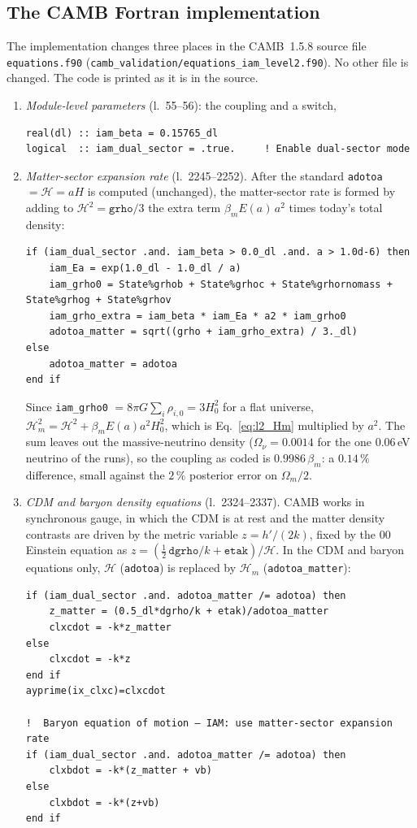 \subsection{The CAMB Fortran implementation}\label{sec:l2_code}
The implementation changes three places in the CAMB~1.5.8 source file \texttt{equations.f90} (\texttt{camb\_validation/equations\_iam\_level2.f90}).
No other file is changed. The code is printed as it is in the source.
\begin{enumerate}
\item \emph{Module-level parameters} (l.~55--56): the coupling and a switch,
\begin{Verbatim}[breaklines,breakanywhere,fontsize=\footnotesize]
real(dl) :: iam_beta = 0.15765_dl
logical  :: iam_dual_sector = .true.     ! Enable dual-sector mode
\end{Verbatim}
\item \emph{Matter-sector expansion rate} (l.~2245--2252). After the standard \texttt{adotoa} $=\mathcal H=aH$ is computed (unchanged), the
matter-sector rate is formed by adding to $\mathcal H^2=\texttt{grho}/3$ the extra term $\beta_mE(a)\,a^2$ times today's total density:
\begin{Verbatim}[breaklines,breakanywhere,fontsize=\footnotesize]
if (iam_dual_sector .and. iam_beta > 0.0_dl .and. a > 1.0d-6) then
    iam_Ea = exp(1.0_dl - 1.0_dl / a)
    iam_grho0 = State%grhob + State%grhoc + State%grhornomass + State%grhog + State%grhov
    iam_grho_extra = iam_beta * iam_Ea * a2 * iam_grho0
    adotoa_matter = sqrt((grho + iam_grho_extra) / 3._dl)
else
    adotoa_matter = adotoa
end if
\end{Verbatim}
Since \texttt{iam\_grho0} $=8\pi G\sum_i\rho_{i,0}=3H_0^2$ for a flat universe, $\mathcal H_m^2=\mathcal H^2+\beta_mE(a)a^2H_0^2$, which is
Eq.~\eqref{eq:l2_Hm} multiplied by $a^2$. The sum leaves out the massive-neutrino density ($\Omega_\nu=0.0014$ for the one $0.06$\,eV neutrino of
the runs), so the coupling as coded is $0.9986\,\beta_m$: a $0.14\,\%$ difference, small against the $2\,\%$ posterior error on $\Omega_m/2$. \calc
\item \emph{CDM and baryon density equations} (l.~2324--2337). CAMB works in synchronous gauge, in which the CDM is at rest and the matter density
contrasts are driven by the metric variable $z=h'/(2k)$, fixed by the $00$ Einstein equation as $z=(\tfrac12\,\texttt{dgrho}/k+\texttt{etak})/\mathcal H$.
In the CDM and baryon equations only, $\mathcal H$ (\texttt{adotoa}) is replaced by $\mathcal H_m$ (\texttt{adotoa\_matter}):
\begin{Verbatim}[breaklines,breakanywhere,fontsize=\footnotesize]
if (iam_dual_sector .and. adotoa_matter /= adotoa) then
    z_matter = (0.5_dl*dgrho/k + etak)/adotoa_matter
    clxcdot = -k*z_matter
else
    clxcdot = -k*z
end if
ayprime(ix_clxc)=clxcdot

!  Baryon equation of motion — IAM: use matter-sector expansion rate
if (iam_dual_sector .and. adotoa_matter /= adotoa) then
    clxbdot = -k*(z_matter + vb)
else
    clxbdot = -k*(z+vb)
end if
\end{Verbatim}
\end{enumerate}
